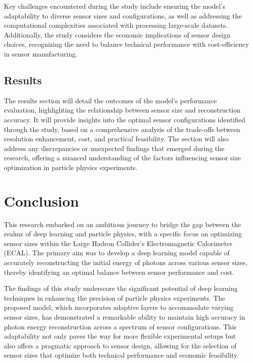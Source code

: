 \documentclass[conference]{IEEEtran}
\begin{document}
Key challenges encountered during the study include ensuring the model's adaptability to diverse sensor sizes and configurations, as well as addressing the computational complexities associated with processing large-scale datasets. Additionally, the study considers the economic implications of sensor design choices, recognizing the need to balance technical performance with cost-efficiency in sensor manufacturing.

\subsection{Results}

The results section will detail the outcomes of the model's performance evaluation, highlighting the relationship between sensor size and reconstruction accuracy. It will provide insights into the optimal sensor configurations identified through the study, based on a comprehensive analysis of the trade-offs between resolution enhancement, cost, and practical feasibility. The section will also address any discrepancies or unexpected findings that emerged during the research, offering a nuanced understanding of the factors influencing sensor size optimization in particle physics experiments.

\section{Conclusion}

This research embarked on an ambitious journey to bridge the gap between the realms of deep learning and particle physics, with a specific focus on optimizing sensor sizes within the Large Hadron Collider's Electromagnetic Calorimeter (ECAL). The primary aim was to develop a deep learning model capable of accurately reconstructing the initial energy of photons across various sensor sizes, thereby identifying an optimal balance between sensor performance and cost.

The findings of this study underscore the significant potential of deep learning techniques in enhancing the precision of particle physics experiments. The proposed model, which incorporates adaptive layers to accommodate varying sensor sizes, has demonstrated a remarkable ability to maintain high accuracy in photon energy reconstruction across a spectrum of sensor configurations. This adaptability not only paves the way for more flexible experimental setups but also offers a pragmatic approach to sensor design, allowing for the selection of sensor sizes that optimize both technical performance and economic feasibility.
\end{document}
